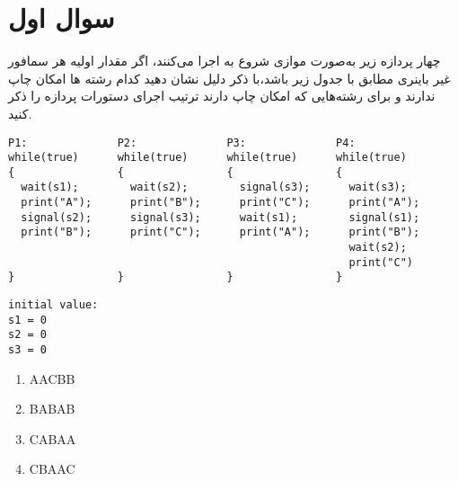 \section{سوال اول}

چهار پردازه زیر به‌صورت موازی شروع به اجرا می‌کنند، اگر مقدار اولیه هر سمافور غیر باینری مطابق با جدول زیر باشد،‌با ذکر دلیل نشان دهید کدام رشته ها امکان چاپ ندارند و برای رشته‌هایی که امکان چاپ دارند ترتیب اجرای دستورات پردازه را ذکر کنید.


\begin{latin}
\begin{lstlisting}
P1:              P2:              P3:              P4:
while(true)      while(true)      while(true)      while(true)
{                {                {                {
  wait(s1);        wait(s2);        signal(s3);      wait(s3);
  print("A");      print("B");      print("C");      print("A");
  signal(s2);      signal(s3);      wait(s1);        signal(s1);
  print("B");      print("C");      print("A");      print("B");
                                                     wait(s2);
                                                     print("C")
}                }                }                }
\end{lstlisting}
\end{latin}

\begin{latin}
\begin{lstlisting}
initial value:
s1 = 0
s2 = 0
s3 = 0
\end{lstlisting}
\end{latin}

\begin{enumerate}
	\item AACBB
	\item BABAB
	\item CABAA
	\item CBAAC
\end{enumerate}



